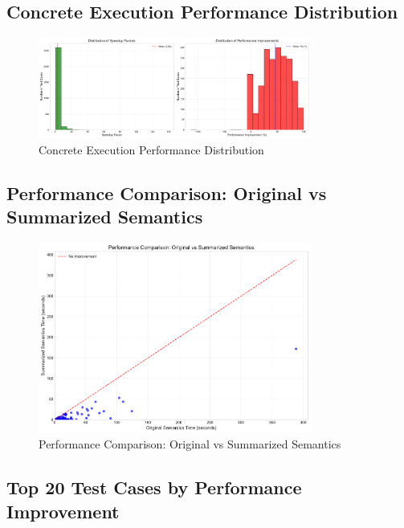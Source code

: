 \documentclass[article]{article}
\begin{document}
\subsection{Concrete Execution Performance Distribution}\label{fig:concrete_performance_distribution}

\begin{figure}[H]
\centering
\includegraphics[width=0.8\textwidth]{charts/concrete_performance_distribution.pdf}
\caption{Concrete Execution Performance Distribution}
\label{fig:concrete_performance_distribution}
\end{figure}

\newpage

\subsection{Performance Comparison: Original vs Summarized Semantics}\label{fig:concrete_performance_scatter}

\begin{figure}[H]
\centering
\includegraphics[width=0.8\textwidth]{charts/concrete_performance_scatter.pdf}
\caption{Performance Comparison: Original vs Summarized Semantics}
\label{fig:concrete_performance_scatter}
\end{figure}

\newpage

\subsection{Top 20 Test Cases by Performance Improvement}\label{fig:concrete_test_case_improvement}
\end{document}
